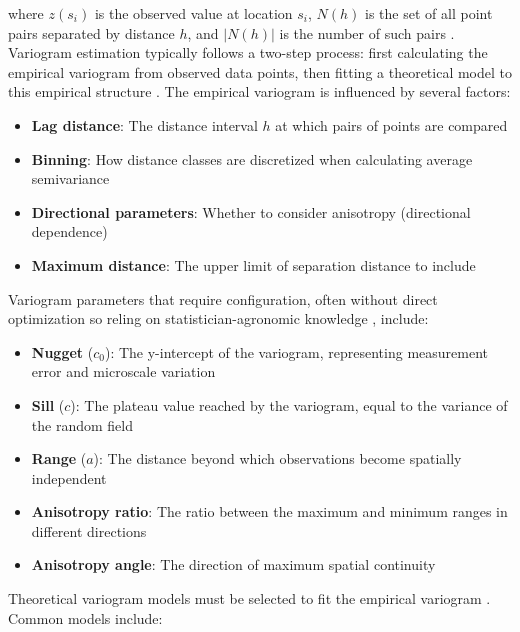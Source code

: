 \documentclass[12pt,a4paper,oneside]{report}
\begin{document}
where $z(s_i)$ is the observed value at location $s_i$, $N(h)$ is the set of all 
point pairs separated by distance $h$, and $|N(h)|$ is the number of such pairs
\cite{matheronPrinciplesGeostatistics1963,journelMiningGeostatistics2003}.
Variogram estimation typically follows a two-step process: first calculating the 
empirical variogram from observed data points, then fitting a theoretical model to 
this empirical structure \cite{websterGeostatisticsEnvironmentalScientists2007, oliverGeostatisticalApplicationsPrecision2010}. 
The empirical variogram is influenced by several factors:

\begin{itemize} 
    \item \textbf{Lag distance}: The distance interval $h$ at which pairs of points are compared 
    \item \textbf{Binning}: How distance classes are discretized when calculating average semivariance 
    \item \textbf{Directional parameters}: Whether to consider anisotropy (directional dependence) 
    \item \textbf{Maximum distance}: The upper limit of separation distance to include 
\end{itemize}

Variogram parameters that require configuration, often without direct 
optimization so reling on statistician-agronomic knowledge
\cite{mullerGeostatisticalModellingPython2022}, 
include:

\begin{itemize} 
    \item \textbf{Nugget} ($c_0$): The y-intercept of the variogram, representing measurement error and microscale variation 
    \item \textbf{Sill} ($c$): The plateau value reached by the variogram, equal to the variance of the random field 
    \item \textbf{Range} ($a$): The distance beyond which observations become spatially independent 
    \item \textbf{Anisotropy ratio}: The ratio between the maximum and minimum ranges in different directions 
    \item \textbf{Anisotropy angle}: The direction of maximum spatial continuity 
\end{itemize}

Theoretical variogram models must be selected to fit the empirical variogram
\cite{cressieStatisticsSpatialData2015, goovaertsGeostatisticsNaturalResources1997}. 
Common models include:
\end{document}
